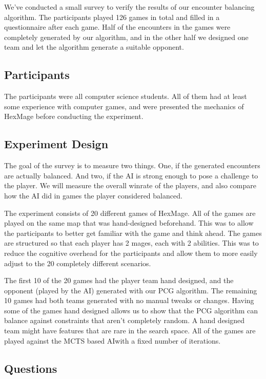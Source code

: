 We've conducted a small survey to verify the results of our encounter balancing algorithm.
The participants played 126 games in total and filled in a questionnaire after each game. Half of the encounters
in the games were completely generated by our algorithm, and in the other half we designed one team and let
the algorithm generate a suitable opponent.

\subsection{Participants}

The participants were all computer science students. All of them had at least
some experience with computer games, and were presented the mechanics of HexMage
before conducting the experiment.

\subsection{Experiment Design}

The goal of the survey is to measure two things. One, if the generated
encounters are actually balanced. And two, if the AI is strong enough to pose a
challenge to the player. We will measure the overall winrate of the players,
and also compare how the AI did in games the player considered balanced.

The experiment consists of 20 different games of HexMage. All of the games are
played on the same map that was hand-designed beforehand. This was to allow the
participants to better get familiar with the game and think ahead. The games
are structured so that each player has 2 mages, each with 2 abilities. This was
to reduce the cognitive overhead for the participants and allow them to more easily
adjust to the 20 completely different scenarios.

The first 10 of the 20 games had the player team hand designed, and the
opponent (played by the AI) generated with our PCG algorithm. The remaining 10
games had both teams generated with no manual tweaks or changes. Having some of
the games hand designed allows us to show that the PCG algorithm can balance
against constraints that aren't completely random. A hand designed team might
have features that are rare in the search space. All of the games are played
against the MCTS based AI\@ with a fixed number of iterations.

\subsection{Questions}

